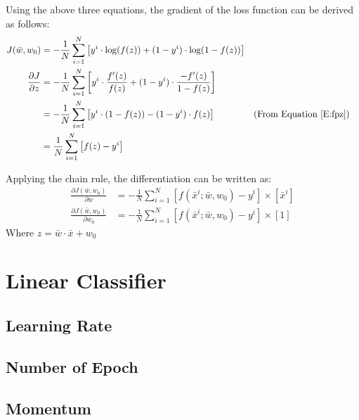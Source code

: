 \documentclass[12pt, a4paper, twoside]{article}
\begin{document}
Using the above three equations, the gradient of the loss function can be derived as follows:
\begin{align}
	J(\bar{w}, w_0) &= - \frac{1}{N} \sum_{i=1}^{N} \left[  y^i \cdot \log(f(z)) + (1-y^i) \cdot \log(1-f(z))   \right] \\
	\frac{\partial J}{\partial z} &= - \frac{1}{N} \sum_{i=1}^{N} \left[  y^i \cdot \frac{f^{\prime}(z)}{f(z)} + (1-y^i) \cdot \frac{-f^{\prime}(z)}{1-f(z)}   \right] \\
	&= - \frac{1}{N} \sum_{i=1}^{N} \left[  y^i \cdot (1-f(z)) - (1-y^i) \cdot f(z)   \right] && \text{(From Equation \ref{E:fpz}})\\
	&= \frac{1}{N} \sum_{i=1}^{N} \left[  f(z) - y^i   \right] 
\end{align}

Applying the chain rule, the differentiation can be written as:
\begin{align}
	\frac{\partial J(\bar{w}, w_0)}{\partial \bar{w}} &= - \frac{1}{N} \sum_{i=1}^{N} \left[  f(\bar{x}^i; \bar{w}, w_0) - y^i   \right] \times \left[ \bar{x}^i \right] \\
	\frac{\partial J(\bar{w}, w_0)}{\partial w_0} &= - \frac{1}{N} \sum_{i=1}^{N} \left[  f(\bar{x}^i; \bar{w}, w_0) - y^i   \right] \times \left[ 1 \right] 
\end{align}
Where $z = \bar{w} \cdot \bar{x} + w_0$ 
\section{Linear Classifier}\label{S:LC}
\subsection{Learning Rate}\label{SS:lc-rate}
\lipsum[4]
\subsection{Number of Epoch}\label{SS:lc-ep}
\lipsum[5]
\subsection{Momentum}\label{SS:lc-mom}
\lipsum[6]
\end{document}
